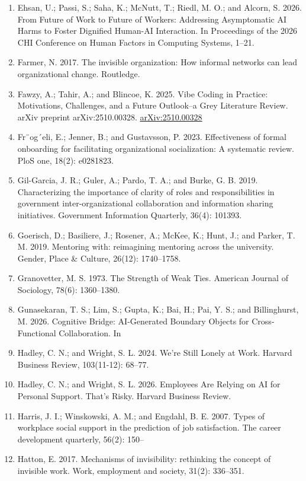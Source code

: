 \documentclass[11pt]{article}
\begin{document}
\begin{enumerate}[leftmargin=*]
  \item Ehsan, U.; Passi, S.; Saha, K.; McNutt, T.; Riedl, M. O.; and Alcorn, S. 2026. From Future of Work to Future of Workers: Addressing Asymptomatic AI Harms to Foster Dignified Human-AI Interaction. In Proceedings of the 2026 CHI Conference on Human Factors in Computing Systems, 1–21.
  \item Farmer, N. 2017. The invisible organization: How informal networks can lead organizational change. Routledge.
  \item Fawzy, A.; Tahir, A.; and Blincoe, K. 2025. Vibe Coding in Practice: Motivations, Challenges, and a Future Outlook–a Grey Literature Review. arXiv preprint arXiv:2510.00328. \href{https://arxiv.org/abs/2510.00328}{arXiv:2510.00328}
  \item Fr¨og´eli, E.; Jenner, B.; and Gustavsson, P. 2023. Effectiveness of formal onboarding for facilitating organizational socialization: A systematic review. PloS one, 18(2): e0281823.
  \item Gil-Garcia, J. R.; Guler, A.; Pardo, T. A.; and Burke, G. B. 2019. Characterizing the importance of clarity of roles and responsibilities in government inter-organizational collaboration and information sharing initiatives. Government Information Quarterly, 36(4): 101393.
  \item Goerisch, D.; Basiliere, J.; Rosener, A.; McKee, K.; Hunt, J.; and Parker, T. M. 2019. Mentoring with: reimagining mentoring across the university. Gender, Place \& Culture, 26(12): 1740–1758.
  \item Granovetter, M. S. 1973. The Strength of Weak Ties. American Journal of Sociology, 78(6): 1360–1380.
  \item Gunasekaran, T. S.; Lim, S.; Gupta, K.; Bai, H.; Pai, Y. S.; and Billinghurst, M. 2026. Cognitive Bridge: AI-Generated Boundary Objects for Cross-Functional Collaboration. In
  \item Hadley, C. N.; and Wright, S. L. 2024. We’re Still Lonely at Work. Harvard Business Review, 103(11-12): 68–77.
  \item Hadley, C. N.; and Wright, S. L. 2026. Employees Are Relying on AI for Personal Support. That’s Risky. Harvard Business Review.
  \item Harris, J. I.; Winskowski, A. M.; and Engdahl, B. E. 2007. Types of workplace social support in the prediction of job satisfaction. The career development quarterly, 56(2): 150–
  \item Hatton, E. 2017. Mechanisms of invisibility: rethinking the concept of invisible work. Work, employment and society, 31(2): 336–351.

\end{enumerate}
\end{document}
